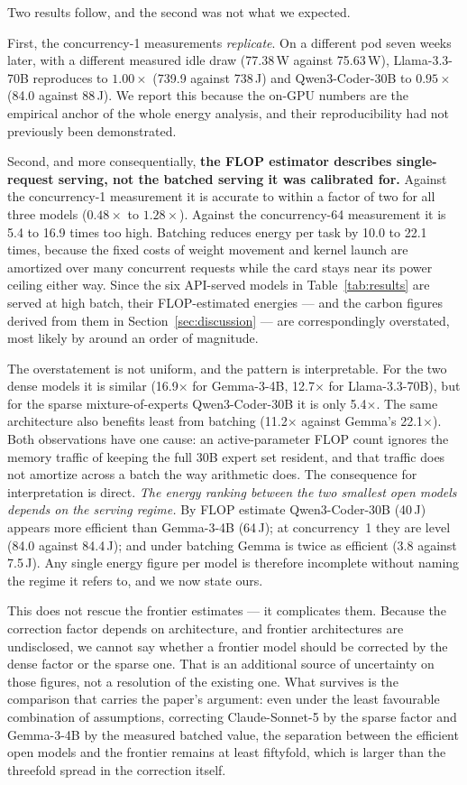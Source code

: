 \documentclass[computers,article,submit,moreauthors]{Definitions/mdpi}
\begin{document}
Two results follow, and the second was not what we expected.

First, the concurrency-1 measurements \emph{replicate}. On a different pod seven weeks later, with a different measured idle draw (77.38\,W against 75.63\,W), Llama-3.3-70B reproduces to $1.00\times$ (739.9 against 738\,J) and Qwen3-Coder-30B to $0.95\times$ (84.0 against 88\,J). We report this because the on-GPU numbers are the empirical anchor of the whole energy analysis, and their reproducibility had not previously been demonstrated.

Second, and more consequentially, \textbf{the FLOP estimator describes single-request serving, not the batched serving it was calibrated for.} Against the concurrency-1 measurement it is accurate to within a factor of two for all three models ($0.48\times$ to $1.28\times$). Against the concurrency-64 measurement it is 5.4 to 16.9 times too high. Batching reduces energy per task by 10.0 to 22.1 times, because the fixed costs of weight movement and kernel launch are amortized over many concurrent requests while the card stays near its power ceiling either way. Since the six API-served models in Table~\ref{tab:results} are served at high batch, their FLOP-estimated energies --- and the carbon figures derived from them in Section~\ref{sec:discussion} --- are correspondingly overstated, most likely by around an order of magnitude.

The overstatement is not uniform, and the pattern is interpretable. For the two dense models it is similar (16.9$\times$ for Gemma-3-4B, 12.7$\times$ for Llama-3.3-70B), but for the sparse mixture-of-experts Qwen3-Coder-30B it is only 5.4$\times$. The same architecture also benefits least from batching (11.2$\times$ against Gemma's 22.1$\times$). Both observations have one cause: an active-parameter FLOP count ignores the memory traffic of keeping the full 30B expert set resident, and that traffic does not amortize across a batch the way arithmetic does. The consequence for interpretation is direct. \emph{The energy ranking between the two smallest open models depends on the serving regime.} By FLOP estimate Qwen3-Coder-30B (40\,J) appears more efficient than Gemma-3-4B (64\,J); at concurrency~1 they are level (84.0 against 84.4\,J); and under batching Gemma is twice as efficient (3.8 against 7.5\,J). Any single energy figure per model is therefore incomplete without naming the regime it refers to, and we now state ours.

This does not rescue the frontier estimates --- it complicates them. Because the correction factor depends on architecture, and frontier architectures are undisclosed, we cannot say whether a frontier model should be corrected by the dense factor or the sparse one. That is an additional source of uncertainty on those figures, not a resolution of the existing one. What survives is the comparison that carries the paper's argument: even under the least favourable combination of assumptions, correcting Claude-Sonnet-5 by the sparse factor and Gemma-3-4B by the measured batched value, the separation between the efficient open models and the frontier remains at least fiftyfold, which is larger than the threefold spread in the correction itself.
\end{document}
